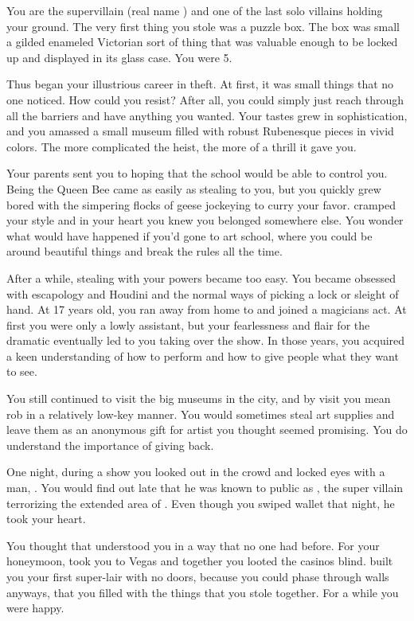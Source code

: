 \documentclass[char]{LRSguildcamp1}
\begin{document}
\name{\cGrandma{}}

You are the supervillain \cGrandma{\MYsupername} (real name \cGrandma{\intro}) and one of the last solo villains holding your ground. The very first thing you stole was a puzzle box. The box was small a gilded enameled Victorian sort of thing that was valuable enough to be locked up and displayed in its glass case. You were 5. 

Thus began your illustrious career in theft. At first, it was small things that no one noticed. How could you resist? After all, you could simply just reach through all the barriers and have anything you wanted. Your tastes grew in sophistication, and you amassed a small museum filled with robust Rubenesque pieces in vivid colors. The more complicated the heist, the more of a thrill it gave you. 

Your parents sent you to \pSuperSchool{} hoping that the school would be able to control you. Being the Queen Bee came as  easily as stealing to you, but you quickly grew bored with the simpering flocks of geese jockeying to curry your favor. \pSuperSchool{} cramped your style and in your heart you knew you belonged somewhere else. You wonder what would have happened if you'd gone to art school, where you could be around beautiful things and break the rules all the time. 

After a while, stealing with your powers became too easy. You became obsessed with escapology and Houdini and the normal ways of picking a lock or sleight of hand. At 17 years old, you ran away from home to \pCityGrandma{} and joined a magicians act. At first you were only a lowly assistant, but your fearlessness and flair for the dramatic eventually led to you taking over the show. In those years, you acquired a keen understanding of how to perform and how to give people what they want to see. 

You still continued to visit the big museums in the city, and by visit you mean rob in a relatively low-key manner. You would sometimes steal art supplies and leave them as an anonymous gift for artist you thought seemed promising. You do understand the importance of giving back. 

One night, during a show you looked out in the crowd and locked eyes with a man, \cGS{\intro}. You would find out late that he was known to public as \cGS{}, the super villain terrorizing the extended area of \pCityO{}. Even though you swiped \cGS{\their} wallet that night, he took your heart. 

You thought that \cGS{\intro} understood you in a way that no one had before. For your honeymoon, \cGS{\they} took you to Vegas and together you looted the casinos blind. \cGS{\They} built you your first super-lair with no doors, because you could phase through walls anyways, that you filled with the things that you stole together. For a while you were happy. 
\end{document}
